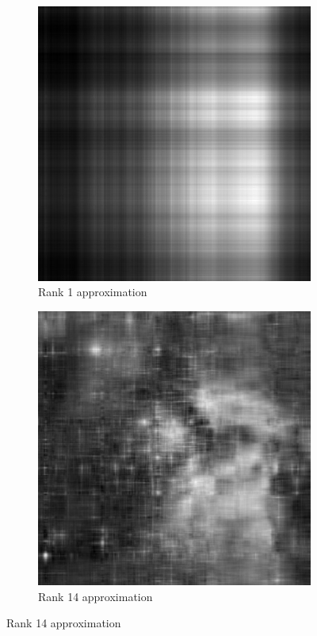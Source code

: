 \begin{figure}
\centering
\begin{subfigure}[b]{.49\textwidth}
\centering
\includegraphics[width=\textwidth]{rank1.jpg}
\caption{Rank 1 approximation}
\end{subfigure}
\begin{subfigure}[b]{.49\textwidth}
\centering
\includegraphics[width=\textwidth]{rank14.jpg}
\caption{Rank 14 approximation}
\end{subfigure}


\end{figure}
